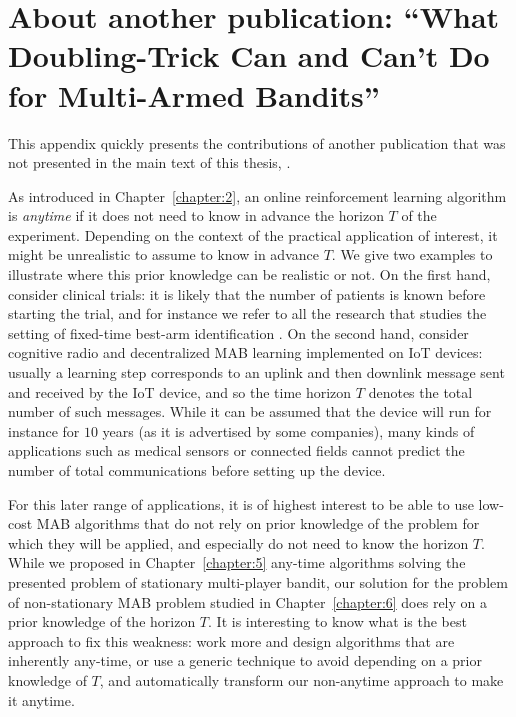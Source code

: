 \chapter{About another publication: ``What Doubling-Trick Can and Can't Do for Multi-Armed Bandits''}
\label{app:2:DoublingTricks}

This appendix quickly presents the contributions of another publication that was not presented in the main text of this thesis, \cite{Besson2018DoublingTricks}.




As introduced in Chapter~\ref{chapter:2},
an online reinforcement learning algorithm is \emph{anytime} if it does not need to know in advance the horizon $T$ of the experiment.
%
Depending on the context of the practical application of interest, it might be unrealistic to assume to know in advance $T$. We give two examples to illustrate where this prior knowledge can be realistic or not.
On the first hand, consider clinical trials: it is likely that the number of patients is known before starting the trial, and for instance we refer to all the research that studies the setting of fixed-time best-arm identification \cite{audibert2010best,Garivier16BAI}.
On the second hand, consider cognitive radio and decentralized MAB learning implemented on IoT devices: usually a learning step corresponds to an uplink and then downlink message sent and received by the IoT device, and so the time horizon $T$ denotes the total number of such messages. While it can be assumed that the device will run for instance for $10$ years (as it is advertised by some companies), many kinds of applications such as medical sensors or connected fields cannot predict the number of total communications before setting up the device.

For this later range of applications, it is of highest interest to be able to use low-cost MAB algorithms that do not rely on prior knowledge of the problem for which they will be applied, and especially do not need to know the horizon $T$.
While we proposed in Chapter~\ref{chapter:5} any-time algorithms solving the presented problem of stationary multi-player bandit, our solution for the problem of non-stationary MAB problem studied in Chapter~\ref{chapter:6} does rely on a prior knowledge of the horizon $T$.
It is interesting to know what is the best approach to fix this weakness: work more and design algorithms that are inherently any-time, or use a generic technique to avoid depending on a prior knowledge of $T$, and automatically transform our non-anytime approach to make it anytime.

